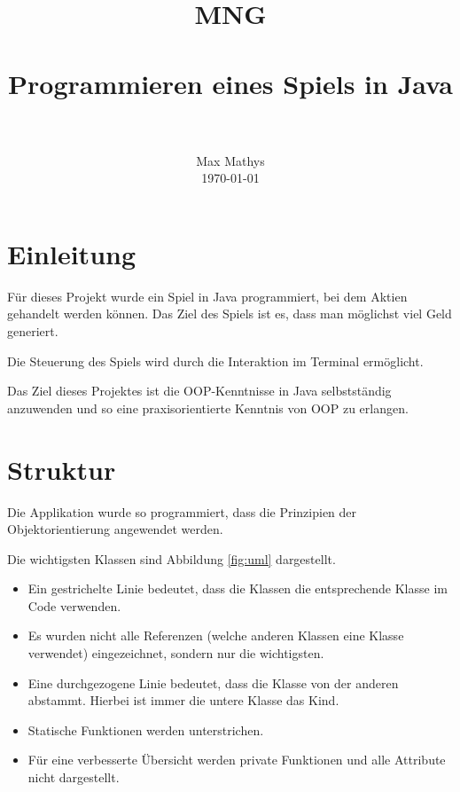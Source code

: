 \documentclass[paper=a4, fontsize=11pt]{article}
\title{
	\usefont{OT1}{bch}{b}{n}
	\normalfont \normalsize \textsc{MNG} \\ [25pt]
	\horrule{0.5pt} \\[0.4cm]
	\huge Programmieren eines Spiels in Java \\
	\horrule{2pt} \\[0.5cm]
}
\author{
	\normalfont 								\normalsize
	Max Mathys\\[-3pt]		\normalsize
	\today
}
\date{}
\numberwithin{equation}{section}		%
\numberwithin{figure}{section}			%
\numberwithin{table}{section}				%
\begin{document}
	\maketitle
	\section{Einleitung}
	
	Für dieses Projekt wurde ein Spiel in Java programmiert, bei dem Aktien gehandelt werden können. Das Ziel des Spiels ist es, dass man möglichst viel Geld generiert.
	
	Die Steuerung des Spiels wird durch die Interaktion im Terminal ermöglicht.
	
	Das Ziel dieses Projektes ist die OOP-Kenntnisse in Java selbstständig anzuwenden und so eine praxisorientierte Kenntnis von OOP zu erlangen.
	
	\section{Struktur}
	
	Die Applikation wurde so programmiert, dass die Prinzipien der Objektorientierung angewendet werden.
	
	Die wichtigsten Klassen sind Abbildung \ref{fig:uml} dargestellt.
	
	\begin{itemize}
		\item Ein gestrichelte Linie bedeutet, dass die Klassen die entsprechende Klasse im Code verwenden.
		\item Es wurden nicht alle Referenzen (welche anderen Klassen eine Klasse verwendet)  eingezeichnet, sondern nur die wichtigsten.
		\item Eine durchgezogene Linie bedeutet, dass die Klasse von der anderen abstammt. Hierbei ist immer die untere Klasse das Kind.
		\item Statische Funktionen werden unterstrichen.
		\item Für eine verbesserte Übersicht werden private Funktionen und alle Attribute nicht dargestellt.
		
	\end{itemize}
	
\end{document}
